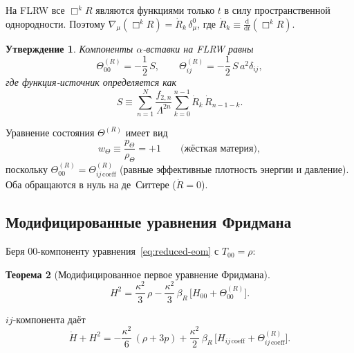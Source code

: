 \documentclass[12pt,a4paper]{article}
\newcommand{\dd}{\mathrm{d}}
\newcommand{\Lam}{\Lambda}
\theoremstyle{plain}
\newtheorem{theorem}{Теорема}[section]
\newtheorem{proposition}[theorem]{Утверждение}
\theoremstyle{definition}
\begin{document}
На FLRW все $\Box^k R$ являются функциями только $t$ в силу
пространственной однородности.  Поэтому
$\nabla_\mu(\Box^k R) = \dot{R}_k\,\delta^0_\mu$, где
$\dot{R}_k \equiv \frac{\dd}{\dd t}(\Box^k R)$.

\begin{proposition}
\label{prop:theta-FLRW}
Компоненты $\alpha$-вставки на FLRW равны
\begin{equation}\label{eq:theta-FLRW}
  \Theta^{(R)}_{00} = -\frac{1}{2}\,S,
  \qquad
  \Theta^{(R)}_{ij} = -\frac{1}{2}\,S\,a^2\delta_{ij},
\end{equation}
где функция-источник определяется как
\begin{equation}\label{eq:S-source}
  S \equiv \sum_{n=1}^{N} \frac{f_{2,n}}{\Lam^{2n}}
  \sum_{k=0}^{n-1} \dot{R}_k\,\dot{R}_{n-1-k}.
\end{equation}
\end{proposition}

\noindent
Уравнение состояния $\Theta^{(R)}$ имеет вид
\begin{equation}\label{eq:eos-theta}
  w_\Theta \equiv \frac{p_\Theta}{\rho_\Theta} = +1
  \qquad\text{(жёсткая материя)},
\end{equation}
поскольку $\Theta^{(R)}_{00} = \Theta^{(R)}_{ij\,\mathrm{coeff}}$
(равные эффективные плотность энергии и давление).  Оба обращаются в нуль
на де~Ситтере ($\dot{R} = 0$).

\subsection{Модифицированные уравнения Фридмана}

Беря 00-компоненту уравнения~\eqref{eq:reduced-eom} с $T_{00} = \rho$:

\begin{theorem}[Модифицированное первое уравнение Фридмана]
\label{thm:friedmann-1}
\begin{equation}\label{eq:friedmann-1}
  \boxed{
  H^2 = \frac{\kappa^2}{3}\,\rho
  - \frac{\kappa^2}{3}\,\beta_R\,
  \bigl[H_{00} + \Theta^{(R)}_{00}\bigr].
  }
\end{equation}
\end{theorem}

\noindent
$ij$-компонента даёт
\begin{equation}\label{eq:friedmann-2}
  \dot{H} + H^2 = -\frac{\kappa^2}{6}\,(\rho + 3p)
  + \frac{\kappa^2}{2}\,\beta_R\,
  \bigl[H_{ij\,\mathrm{coeff}}
  + \Theta^{(R)}_{ij\,\mathrm{coeff}}\bigr].
\end{equation}
\end{document}
